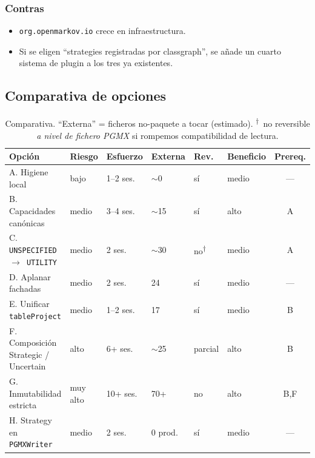 \documentclass[11pt,a4paper]{article}
\newcommand{\code}[1]{\texttt{#1}}
\begin{document}
\subsubsection*{Contras}
\begin{itemize}[leftmargin=*]
  \item \code{org.openmarkov.io} crece en infraestructura.
  \item Si se eligen ``strategies registradas por classgraph'', se añade un
        cuarto sistema de plugin a los tres ya existentes.
\end{itemize}

\subsection{Comparativa de opciones}

\begin{table}[H]
\centering
\scriptsize
\setlength{\tabcolsep}{4pt}
\begin{tabular}{p{4cm}lllllc}
\toprule
\textbf{Opción} & \textbf{Riesgo} & \textbf{Esfuerzo} &
\textbf{Externa} & \textbf{Rev.} & \textbf{Beneficio} & \textbf{Prereq.} \\
\midrule
A. Higiene local                       & bajo     & 1--2 ses. & $\sim$0  & sí      & medio & --- \\
B. Capacidades canónicas               & medio    & 3--4 ses. & $\sim$15 & sí      & alto  & A   \\
C. \code{UNSPECIFIED $\to$ UTILITY}    & medio    & 2 ses.    & $\sim$30 & no\textsuperscript{$\dagger$} & medio & A \\
D. Aplanar fachadas                    & medio    & 2 ses.    & 24       & sí      & medio & --- \\
E. Unificar \code{tableProject}        & medio    & 1--2 ses. & 17       & sí      & medio & B   \\
F. Composición Strategic / Uncertain   & alto     & 6+ ses.   & $\sim$25 & parcial & alto  & B   \\
G. Inmutabilidad estricta              & muy alto & 10+ ses.  & 70+      & no      & alto  & B,F \\
H. Strategy en \code{PGMXWriter}       & medio    & 2 ses.    & 0 prod.  & sí      & medio & --- \\
\bottomrule
\end{tabular}
\caption{Comparativa. ``Externa'' = ficheros no-paquete a tocar (estimado).
         \textsuperscript{$\dagger$}~no reversible \emph{a nivel de fichero
         PGMX} si rompemos compatibilidad de lectura.}
\end{table}
\end{document}
